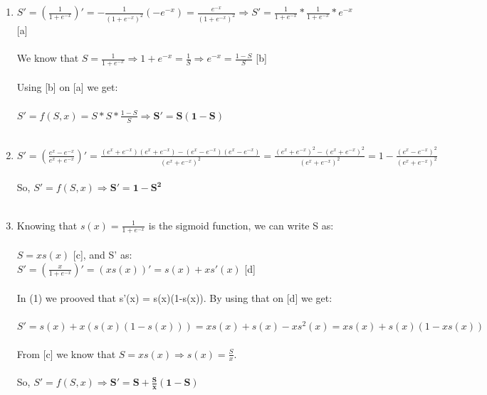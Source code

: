 \documentclass{article}
\begin{document}
\begin{enumerate}
  \item $S' = (\frac{1}{1+e^{-x}})' = -\frac{1}{(1+e^{-x})^2}(-e^{-x}) = \frac{e^{-x}}{(1+e^{-x})^2} \Rightarrow S' = \frac{1}{1+e^{-x}} * \frac{1}{1+e^{-x}} * e^{-x}$ \hspace{0.5cm} [a] \\ \\
    We know that $S = \frac{1}{1+e^{-x}} \Rightarrow 1+e^{-x} = \frac{1}{S}  \Rightarrow e^{-x} = \frac{1-S}{S}$ \hspace{3.2cm} [b]\\ \\ Using [b] on [a] we get: \\ \\
    $S' = f(S,x) = S * S * \frac{1-S}{S} \Rightarrow \bm{S' = S(1-S)}$ \\ \\
  \item $S' = (\frac{e^{x}-e^{-x}}{e^{x}+e^{-x}})' = \frac{(e^{x}+e^{-x})(e^{x}+e^{-x}) - (e^{x}-e^{-x})(e^{x}-e^{-x})}{(e^{x}+e^{-x})^2} = \frac{(e^{x}+e^{-x})^2 - (e^{x}+e^{-x})^2}{(e^{x}+e^{-x})^2}
    = 1 - \frac{(e^{x}-e^{-x})^2}{(e^{x}+e^{-x})^2}$ \\ \\ So, $S' = f(S,x) \Rightarrow \bm{S' = 1 - S^2}$ \\ \\
  \item Knowing that $s(x) = \frac{1}{1+e^{-x}}$ is the sigmoid function, we can write S as: \\ \\ $S = xs(x)$ \hspace{0.3cm} [c], \hspace{0.3cm} and S' as: $S' = (\frac{x}{1+e^{-x}})' = (xs(x))' = s(x) + xs'(x)$ 
  \hspace{1cm} [d] \\ \\In (1) we prooved that s'(x) = s(x)(1-s(x)). By using that on [d] we get: \\ \\ $S' = s(x) + x(s(x)(1-s(x))) = xs(x) + s(x) -xs^2(x) = xs(x) + s(x)(1-xs(x))$ \\ \\ From [c] we know that 
  $S = xs(x) \Rightarrow s(x) = \frac{S}{x}$. \\ \\ So, $S' = f(S,x) \Rightarrow \bm{S' = S + \frac{S}{x}(1-S)}$\\ \\

\end{enumerate}
\end{document}
